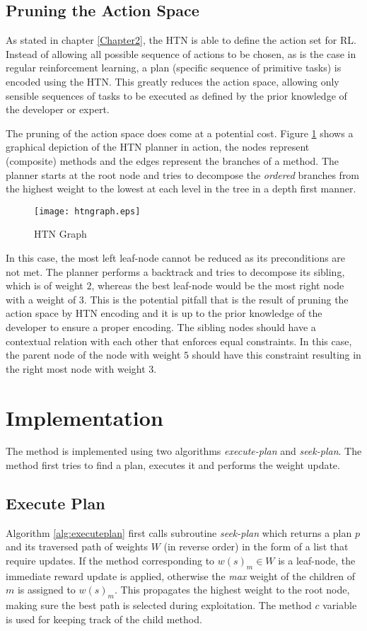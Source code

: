 \subsection{Pruning the Action Space}
As stated in chapter \ref{Chapter2}, the HTN is able to define the action set
for RL. Instead of allowing all possible sequence of actions to be chosen, as
is the case in regular reinforcement learning, a plan (specific sequence of
primitive tasks) is encoded using the HTN. This greatly reduces the action
space, allowing only sensible sequences of tasks to be executed as defined by
the prior knowledge of the developer or expert.

The pruning of the action space does come at a potential cost. Figure
\ref{fig:htngraph} shows a graphical depiction of the HTN planner in action,
the nodes represent (composite) methods and the edges represent the branches of
a method. The planner starts at the root node and tries to decompose the
\emph{ordered} branches from the highest weight to the lowest at each level in
the tree in a depth first manner.
\begin{figure}[!ht]
\centering
\texttt{[image: htngraph.eps]}
\caption{HTN Graph}
\label{fig:htngraph}
\end{figure}
In this case, the most left leaf-node cannot be reduced as its preconditions
are not met. The planner performs a backtrack and tries to decompose its
sibling, which is of weight $2$, whereas the best leaf-node would be the most
right node with a weight of $3$. This is the potential pitfall that is the
result of pruning the action space by HTN encoding and it is up to the prior
knowledge of the developer to ensure a proper encoding. The sibling nodes
should have a contextual relation with each other that enforces equal
constraints. In this case, the parent node of the node with weight $5$ should
have this constraint resulting in the right most node with weight $3$.

\section{Implementation}
The method is implemented using two algorithms \emph{execute-plan} and
\emph{seek-plan}. The method first tries to find a plan, executes it
and performs the weight update.
\subsection{Execute Plan}
Algorithm \ref{alg:executeplan} first calls subroutine \emph{seek-plan} which
returns a plan $p$ and its traversed path of weights $W$ (in reverse order) in
the form of a list that require updates. If the method corresponding to
$w(s)_m \in W$ is a leaf-node, the immediate reward update is applied,
otherwise the \emph{max} weight of the children of $m$ is assigned to $w(s)_m$.
This propagates the highest weight to the root node, making sure the best path
is selected during exploitation. The method $c$ variable is used for keeping
track of the child method.

